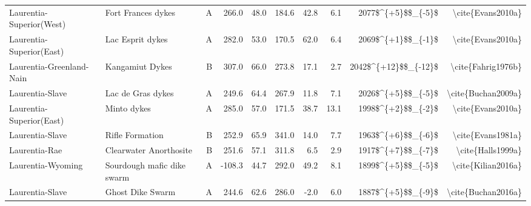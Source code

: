 \begin{longtable}{p{1 in}p{1 in}rrrrrrrr}
      Laurentia-Superior(West) &                               Fort Frances dykes &      A &     266.0 &      48.0 & 184.6 &  42.8 &       6.1 &     2077\$\textasciicircum \{+5\}\$\$\_\{-5\}\$ &                                  \textbackslash cite\{Evans2010a\} \\
      Laurentia-Superior(East) &                                 Lac Esprit dykes &      A &     282.0 &      53.0 & 170.5 &  62.0 &       6.4 &     2069\$\textasciicircum \{+1\}\$\$\_\{-1\}\$ &                                  \textbackslash cite\{Evans2010a\} \\
      Laurentia-Greenland-Nain &                                  Kangamiut Dykes &      B &     307.0 &      66.0 & 273.8 &  17.1 &       2.7 &   2042\$\textasciicircum \{+12\}\$\$\_\{-12\}\$ &                                 \textbackslash cite\{Fahrig1976b\} \\
               Laurentia-Slave &                                Lac de Gras dykes &      A &     249.6 &      64.4 & 267.9 &  11.8 &       7.1 &     2026\$\textasciicircum \{+5\}\$\$\_\{-5\}\$ &                                 \textbackslash cite\{Buchan2009a\} \\
      Laurentia-Superior(East) &                                      Minto dykes &      A &     285.0 &      57.0 & 171.5 &  38.7 &      13.1 &     1998\$\textasciicircum \{+2\}\$\$\_\{-2\}\$ &                                  \textbackslash cite\{Evans2010a\} \\
               Laurentia-Slave &                                  Rifle Formation &      B &     252.9 &      65.9 & 341.0 &  14.0 &       7.7 &     1963\$\textasciicircum \{+6\}\$\$\_\{-6\}\$ &                                  \textbackslash cite\{Evans1981a\} \\
                 Laurentia-Rae &                           Clearwater Anorthosite &      B &     251.6 &      57.1 & 311.8 &   6.5 &       2.9 &     1917\$\textasciicircum \{+7\}\$\$\_\{-7\}\$ &                                  \textbackslash cite\{Halls1999a\} \\
             Laurentia-Wyoming &                       Sourdough mafic dike swarm &      A &    -108.3 &      44.7 & 292.0 &  49.2 &       8.1 &     1899\$\textasciicircum \{+5\}\$\$\_\{-5\}\$ &                                 \textbackslash cite\{Kilian2016a\} \\
               Laurentia-Slave &                                 Ghost Dike Swarm &      A &     244.6 &      62.6 & 286.0 &  -2.0 &       6.0 &     1887\$\textasciicircum \{+5\}\$\$\_\{-9\}\$ &                                 \textbackslash cite\{Buchan2016a\} \\

\end{longtable}
